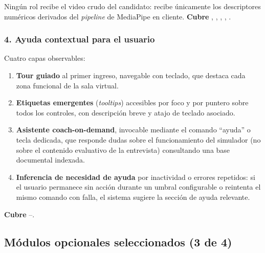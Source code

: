 \noindent Ningún rol recibe el video crudo del candidato: recibe
únicamente los descriptores numéricos derivados del \textit{pipeline}
de MediaPipe en cliente. \textbf{Cubre} , , ,
, .

\subsubsection{4. Ayuda contextual para el usuario}
Cuatro capas observables:

\begin{enumerate}
  \item \textbf{Tour guiado} al primer ingreso, navegable con teclado,
        que destaca cada zona funcional de la sala virtual.
  \item \textbf{Etiquetas emergentes} (\textit{tooltips}) accesibles
        por foco y por puntero sobre todos los controles, con
        descripción breve y atajo de teclado asociado.
  \item \textbf{Asistente coach-on-demand}, invocable mediante el
        comando ``ayuda'' o tecla dedicada, que responde dudas sobre
        el funcionamiento del simulador (no sobre el contenido
        evaluativo de la entrevista) consultando una base documental
        indexada.
  \item \textbf{Inferencia de necesidad de ayuda} por inactividad o
        errores repetidos: si el usuario permanece sin acción durante
        un umbral configurable o reintenta el mismo comando con falla,
        el sistema sugiere la sección de ayuda relevante.
\end{enumerate}

\noindent \textbf{Cubre} --.

\subsection{Módulos opcionales seleccionados (3 de 4)}

